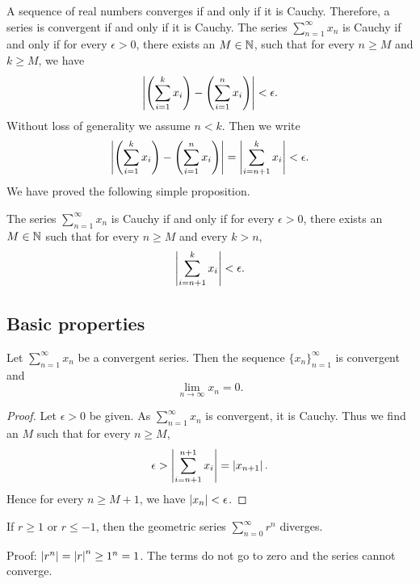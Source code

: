 A sequence of real numbers converges if and only if it is
Cauchy.  Therefore, a series is convergent if and only if it is Cauchy.
The series $\sum_{n=1}^\infty x_n$ is Cauchy if and only if for every $\epsilon > 0$,
there exists an $M \in {\mathbb{N}}$, such that for every $n \geq M$
and $k \geq M$, we have
\begin{equation*}
\left\lvert { \left( \sum_{i=1}^k x_i \right) - \left( \sum_{i=1}^n x_i \right) } \right\rvert
< \epsilon .
\end{equation*}
Without loss of generality we assume $n < k$.  Then we write
\begin{equation*}
\left\lvert { \left( \sum_{i=1}^k x_i \right) - \left( \sum_{i=1}^n x_i \right) } \right\rvert
=
\left\lvert { \sum_{i={n+1}}^k x_i } \right\rvert
< \epsilon .
\end{equation*}
We have proved the following simple proposition.

\begin{prop} \label{prop:cachyser}
The series $\sum_{n=1}^\infty x_n$ is Cauchy
if and only if for every $\epsilon > 0$, 
there exists an $M \in {\mathbb{N}}$ such that for every $n \geq M$
and every $k > n$,
\begin{equation*}
\left\lvert { \sum_{i={n+1}}^k x_i } \right\rvert
< \epsilon .
\end{equation*}
\end{prop}

\subsection{Basic properties}

\begin{prop}
Let $\sum_{n=1}^\infty x_n$ be a convergent series.  Then
the sequence $\{ x_n \}_{n=1}^\infty$ is convergent and
\begin{equation*}
\lim_{n\to\infty} x_n = 0.
\end{equation*}
\end{prop}

\begin{proof}
Let $\epsilon > 0$ be given.  As $\sum_{n=1}^\infty x_n$ is convergent, it is Cauchy.
Thus we find an $M$ such that for every $n \geq M$,
\begin{equation*}
\epsilon > 
\left\lvert { \sum_{i={n+1}}^{n+1} x_i } \right\rvert
=
\left\lvert { x_{n+1} } \right\rvert .
\end{equation*}
Hence for every $n \geq M+1$, we have $\left\lvert {x_{n}} \right\rvert < \epsilon$.
\end{proof}

\begin{example}
If $r \geq 1$ or $r \leq -1$, then the geometric series $\sum_{n=0}^\infty r^n$
diverges.

Proof: $\left\lvert {r^n} \right\rvert = \left\lvert {r} \right\rvert^n \geq 1^n = 1$.  The terms do not go to zero
and the series cannot converge.
\end{example}

